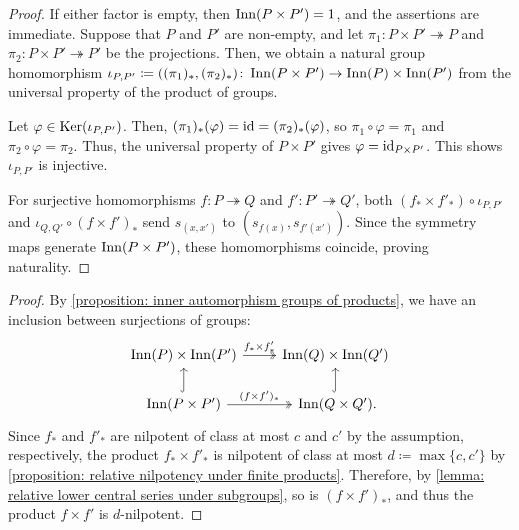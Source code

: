\begin{proof}
If either factor is empty, then $\operatorname{Inn}(P\times P')=1$, and the assertions are immediate.
Suppose that $P$ and $P'$ are non-empty, and let $\pi_1\colon P\times P'\twoheadrightarrow P$ and $\pi_2\colon P\times P'\twoheadrightarrow P'$ be the projections. Then, we obtain a natural group homomorphism $\iota_{P,P'}\coloneqq((\pi_1)_*,(\pi_2)_*)\colon \operatorname{Inn}(P\times P')\to \operatorname{Inn}(P)\times\operatorname{Inn}(P')$ from the universal property of the product of groups.

Let $\varphi\in\operatorname{Ker}(\iota_{P,P'})$. Then, $(\pi_1)_*(\varphi)=\operatorname{id}=(\pi_2)_*(\varphi)$, so $\pi_1\circ\varphi=\pi_1$ and $\pi_2\circ\varphi=\pi_2$. Thus, the universal property of $P\times P'$ gives $\varphi=\operatorname{id}_{P\times P'}$. This shows $\iota_{P,P'}$ is injective.

For surjective homomorphisms $f\colon P\twoheadrightarrow Q$ and $f'\colon P'\twoheadrightarrow Q'$, both $(f_*\times f'_*)\circ\iota_{P,P'}$ and $\iota_{Q,Q'}\circ(f\times f')_*$ send $s_{(x,x')}$ to $(s_{f(x)},s_{f'(x')})$. Since the symmetry maps generate $\operatorname{Inn}(P\times P')$, these homomorphisms coincide, proving naturality.
\end{proof}


\begin{proof}
By \cref{proposition: inner automorphism groups of products}, we have an inclusion between surjections of groups:
\[\begin{tikzcd}
    \Inn(P)\times \Inn(P') \arrow[two heads]{r}{f_*\times f'_*} & \Inn(Q) \times \Inn(Q') \\
    \Inn(P\times P') \arrow[two heads]{r}{(f\times f')_*} \arrow[hook]{u} & \Inn(Q\times Q')\rlap{.} \arrow[hook]{u}
\end{tikzcd}\]
Since $f_*$ and $f'_*$ are nilpotent of class at most $c$ and $c'$ by the assumption, respectively, the product $f_*\times f'_*$ is nilpotent of class at most $d\coloneqq\max\{c,c'\}$ by \cref{proposition: relative nilpotency under finite products}. Therefore, by \cref{lemma: relative lower central series under subgroups}, so is $(f\times f')_*$, and thus the product $f\times f'$ is $d$-nilpotent.
\end{proof}


